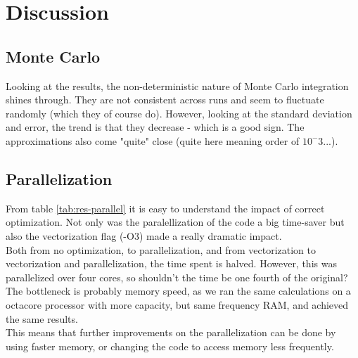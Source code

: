 \documentclass[../main.tex]{subfiles}
\begin{document}
\section{Discussion}
\subsection{Monte Carlo}
Looking at the results, the non-deterministic nature of Monte Carlo integration shines through. They are not consistent across runs and seem to fluctuate randomly (which they of course do). However, looking at the standard deviation and error, the trend is that they decrease - which is a good sign. The approximations also come "quite" close (quite here meaning order of $10^-3$...).

\subsection{Parallelization}
From table \ref{tab:res-parallel} it is easy to understand the impact of correct optimization. Not only was the paralellization of the code a big time-saver but also the vectorization flag (-O3) made a really dramatic impact.\\

Both from no optimization, to parallelization, and from vectorization to vectorization and parallelization, the time spent is halved. However, this was parallelized over four cores, so shouldn't the time be one fourth of the original? The bottleneck is probably memory speed, as we ran the same calculations on a octacore processor with more capacity, but same frequency RAM, and achieved the same results.\\

This means that further improvements on the parallelization can be done by using faster memory, or changing the code to access memory less frequently.
\end{document}
